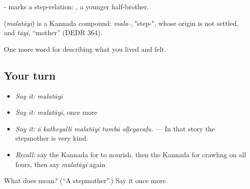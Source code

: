 - marks a step-relation: , a younger half-brother.

\begin{cousinweb}
\textbf{} (\emph{malatāyi}) is a Kannada compound: \emph{mala-}, "step-", whose origin is not settled, and \emph{tāyi}, \textquotedblleft{}mother\textquotedblright{} (DEDR 364).
\end{cousinweb}

\begin{grammarlens}[title={What you've built}]
One more word for describing what you lived and felt.
\end{grammarlens}

\subsection*{Your turn}
\begin{itemize}
\raggedright
  \item \emph{Say it:} \emph{malatāyi}
  \item \emph{Say it:} \emph{malatāyi}, once more
  \item \emph{Say it:} \emph{ā katheyalli malatāyi tumbā oḷḷeyavaḷu.} — In that story the stepmother is very kind.
  \item \emph{Recall:} say the Kannada for to nourish, then the Kannada for crawling on all fours, then say \emph{malatāyi} again
\end{itemize}

\begin{tcolorbox}[breakable,colback=teal!4,colframe=teal!35!black,title={Before you move on}]
What does  mean? (\textquotedblleft{}A stepmother\textquotedblright{}.) Say it once more.
\end{tcolorbox}
